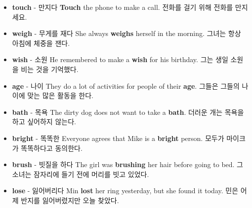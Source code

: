 \documentclass{article}
\begin{document}
\begin{addmargin}[1em]{1em}
\begin{itemize}
        \item \fontsize{12pt}{14pt}\selectfont \textbf{touch} - 만지다 \newline
        \textbf{Touch} the phone to make a call. \newline
        전화를 걸기 위해 전화를 만지세요.
        
        \item \fontsize{12pt}{14pt}\selectfont \textbf{weigh} - 무게를 재다 \newline
        She always \textbf{weighs} herself in the morning. \newline
        그녀는 항상 아침에 체중을 잰다.
        
        \item \fontsize{12pt}{14pt}\selectfont \textbf{wish} - 소원 \newline
        He remembered to make a \textbf{wish} for his birthday. \newline
        그는 생일 소원을 비는 것을 기억했다.
        
        \item \fontsize{12pt}{14pt}\selectfont \textbf{age} - 나이 \newline
        They do a lot of activities for people of their \textbf{age}. \newline
        그들은 그들의 나이에 맞는 많은 활동을 한다.
        
        \item \fontsize{12pt}{14pt}\selectfont \textbf{bath} - 목욕 \newline
        The dirty dog does not want to take a \textbf{bath}. \newline
        더러운 개는 목욕을 하고 싶어하지 않는다.
        
        \item \fontsize{12pt}{14pt}\selectfont \textbf{bright} - 똑똑한 \newline
        Everyone agrees that Mike is a \textbf{bright} person. \newline
        모두가 마이크가 똑똑하다고 동의한다.
        
        \item \fontsize{12pt}{14pt}\selectfont \textbf{brush} - 빗질을 하다 \newline
        The girl was \textbf{brushing} her hair before going to bed. \newline
        그 소녀는 잠자리에 들기 전에 머리를 빗고 있었다.
        
        \item \fontsize{12pt}{14pt}\selectfont \textbf{lose} - 잃어버리다 \newline
        Min \textbf{lost} her ring yesterday, but she found it today. \newline
        민은 어제 반지를 잃어버렸지만 오늘 찾았다.
        

\end{itemize}
\end{addmargin}
\end{document}
